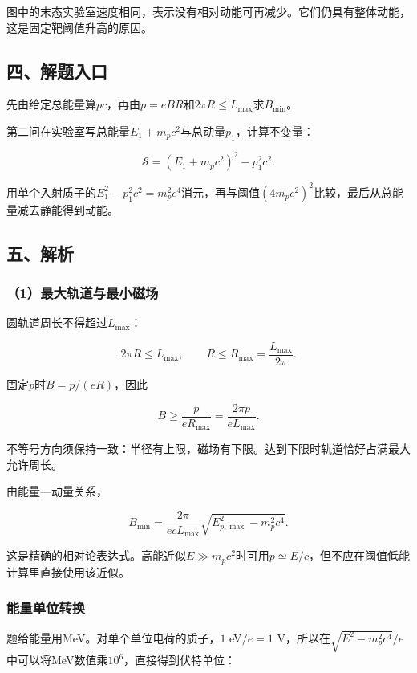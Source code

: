\documentclass[12pt,a4paper,fontset=fandol]{ctexart}
\begin{document}
图中的末态实验室速度相同，表示没有相对动能可再减少。它们仍具有整体动能，这是固定靶阈值升高的原因。

\subsection{四、解题入口}\label{ux56dbux89e3ux9898ux5165ux53e3-3}

先由给定总能量算\(pc\)，再由\(p=eBR\)和\(2\pi R\leq L_{\max}\)求\(B_{\min}\)。

第二问在实验室写总能量\(E_1+m_pc^2\)与总动量\(p_1\)，计算不变量：

\[
\mathcal S=(E_1+m_pc^2)^2-p_1^2c^2.
\]

用单个入射质子的\(E_1^2-p_1^2c^2=m_p^2c^4\)消元，再与阈值\((4m_pc^2)^2\)比较，最后从总能量减去静能得到动能。

\subsection{五、解析}\label{ux4e94ux89e3ux6790-3}

\subsubsection{（1）最大轨道与最小磁场}\label{ux6700ux5927ux8f68ux9053ux4e0eux6700ux5c0fux78c1ux573a}

圆轨道周长不得超过\(L_{\max}\)：

\[
2\pi R\leq L_{\max},\qquad
R\leq R_{\max}=\frac{L_{\max}}{2\pi}.
\]

固定\(p\)时\(B=p/(eR)\)，因此

\[
B\geq\frac p{eR_{\max}}
=\frac{2\pi p}{eL_{\max}}.
\]

不等号方向须保持一致：半径有上限，磁场有下限。达到下限时轨道恰好占满最大允许周长。

由能量---动量关系，

\[
\boxed{
B_{\min}=
\frac{2\pi}{ecL_{\max}}
\sqrt{E_{p,\max}^2-m_p^2c^4}}.
\]

这是精确的相对论表达式。高能近似\(E\gg m_pc^2\)时可用\(p\simeq E/c\)，但不应在阈值低能计算里直接使用该近似。

\subsubsection{能量单位转换}\label{ux80fdux91cfux5355ux4f4dux8f6cux6362}

题给能量用MeV。对单个单位电荷的质子，\(1\) eV\(/e=1\)
V，所以在\(\sqrt{E^2-m_p^2c^4}/e\)中可以将MeV数值乘\(10^6\)，直接得到伏特单位：
\end{document}
